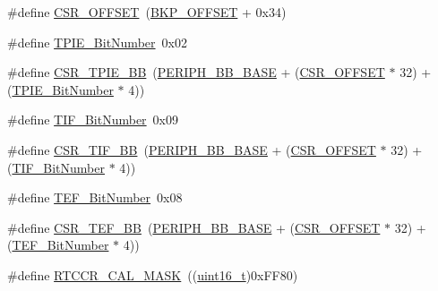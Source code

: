 \begin{DoxyCompactItemize}
\item 
\#define \hyperlink{group___b_k_p___private___defines_ga984cbe73312b6d3d355c5053763d499a}{C\+S\+R\+\_\+\+O\+F\+F\+S\+ET}~(\hyperlink{openmotestm_2library_2src_2stm32f10x__bkp_8c_aaaf71f474657e7c0c5b0d6ba9697cf5d}{B\+K\+P\+\_\+\+O\+F\+F\+S\+ET} + 0x34)
\item 
\#define \hyperlink{group___b_k_p___private___defines_gac62e6ae9548498efa47fb72637545117}{T\+P\+I\+E\+\_\+\+Bit\+Number}~0x02
\item 
\#define \hyperlink{group___b_k_p___private___defines_ga1f6dcf729994613b21f554ca371d393c}{C\+S\+R\+\_\+\+T\+P\+I\+E\+\_\+\+BB}~(\hyperlink{openmotestm_2library_2inc_2stm32f10x__map_8h_aed7efc100877000845c236ccdc9e144a}{P\+E\+R\+I\+P\+H\+\_\+\+B\+B\+\_\+\+B\+A\+SE} + (\hyperlink{openmotestm_2library_2src_2stm32f10x__rcc_8c_a984cbe73312b6d3d355c5053763d499a}{C\+S\+R\+\_\+\+O\+F\+F\+S\+ET} $\ast$ 32) + (\hyperlink{openmotestm_2library_2src_2stm32f10x__bkp_8c_ac62e6ae9548498efa47fb72637545117}{T\+P\+I\+E\+\_\+\+Bit\+Number} $\ast$ 4))
\item 
\#define \hyperlink{group___b_k_p___private___defines_gac8b1b82c7029c05e720c50585762bcf2}{T\+I\+F\+\_\+\+Bit\+Number}~0x09
\item 
\#define \hyperlink{group___b_k_p___private___defines_ga8d9e7cac2321fae6d257e8c1316264e3}{C\+S\+R\+\_\+\+T\+I\+F\+\_\+\+BB}~(\hyperlink{openmotestm_2library_2inc_2stm32f10x__map_8h_aed7efc100877000845c236ccdc9e144a}{P\+E\+R\+I\+P\+H\+\_\+\+B\+B\+\_\+\+B\+A\+SE} + (\hyperlink{openmotestm_2library_2src_2stm32f10x__rcc_8c_a984cbe73312b6d3d355c5053763d499a}{C\+S\+R\+\_\+\+O\+F\+F\+S\+ET} $\ast$ 32) + (\hyperlink{openmotestm_2library_2src_2stm32f10x__bkp_8c_ac8b1b82c7029c05e720c50585762bcf2}{T\+I\+F\+\_\+\+Bit\+Number} $\ast$ 4))
\item 
\#define \hyperlink{group___b_k_p___private___defines_gaeb8676e7543d93df60cf7c63fd795672}{T\+E\+F\+\_\+\+Bit\+Number}~0x08
\item 
\#define \hyperlink{group___b_k_p___private___defines_gad60539cc791a26701d414aee529ea203}{C\+S\+R\+\_\+\+T\+E\+F\+\_\+\+BB}~(\hyperlink{openmotestm_2library_2inc_2stm32f10x__map_8h_aed7efc100877000845c236ccdc9e144a}{P\+E\+R\+I\+P\+H\+\_\+\+B\+B\+\_\+\+B\+A\+SE} + (\hyperlink{openmotestm_2library_2src_2stm32f10x__rcc_8c_a984cbe73312b6d3d355c5053763d499a}{C\+S\+R\+\_\+\+O\+F\+F\+S\+ET} $\ast$ 32) + (\hyperlink{openmotestm_2library_2src_2stm32f10x__bkp_8c_aeb8676e7543d93df60cf7c63fd795672}{T\+E\+F\+\_\+\+Bit\+Number} $\ast$ 4))
\item 
\#define \hyperlink{group___b_k_p___private___defines_ga61a540c5dd9d18e936b8fd3e01f7f6ff}{R\+T\+C\+C\+R\+\_\+\+C\+A\+L\+\_\+\+M\+A\+SK}~((\hyperlink{_p_e___types_8h_a1f1825b69244eb3ad2c7165ddc99c956}{uint16\+\_\+t})0x\+F\+F80)

\end{DoxyCompactItemize}
